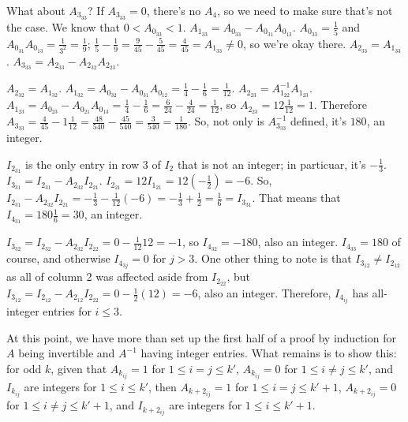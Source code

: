 \documentclass[12pt]{article}
\begin{document}
\begin{enumerate}
    What about $A_{3_{33}}$? If $A_{3_{33}} = 0$, there's no
    $A_4$, so we need to make sure that's not the case. We know
    that $0 < A_{0_{33}} < 1$. $A_{1_{33}} = A_{0_{33}} -
    A_{0_{31}}A_{0_{13}}$. $A_{0_{33}} = \frac{1}{5}$ and
    $A_{0_{31}}A_{0_{13}} = \frac{1}{3^{2}} = \frac{1}{9}$;
    $\frac{1}{5} - \frac{1}{9} = \frac{9}{45} - \frac{5}{45} =
    \frac{4}{45} = A_{1_{33}} \neq 0$, so we're okay there.
    $A_{2_{33}} = A_{1_{33}}$. $A_{3_{33}} = A_{2_{33}} -
    A_{2_{32}}A_{2_{23}}$.

    $A_{2_{32}} = A_{1_{32}}$. $A_{1_{32}} = A_{0_{32}} -
    A_{0_{31}}A_{0_{12}} = \frac{1}{4} - \frac{1}{6} =
    \frac{1}{12}$.  $A_{2_{23}} = A_{1_{22}}^{-1}A_{1_{23}}$.
    $A_{1_{23}} = A_{0_{23}} - A_{0_{21}}A_{0_{13}} = \frac{1}{4}
    - \frac{1}{6} = \frac{6}{24} - \frac{4}{24} = \frac{1}{12}$,
    so $A_{2_{23}} = 12\frac{1}{12} = 1$. Therefore $A_{3_{33}} =
    \frac{4}{45} - 1\frac{1}{12} = \frac{48}{540} -
    \frac{45}{540} = \frac{3}{540} = \frac{1}{180}$. So, not only
    is $A_{3_{33}}^{-1}$ defined, it's $180$, an integer.

    $I_{2_{31}}$ is the only entry in row 3 of $I_2$ that is not
    an integer; in particuar, it's $-\frac{1}{3}$. $I_{3_{31}} =
    I_{2_{31}} - A_{2_{32}}I_{2_{21}}$. $I_{2_{21}} = 12I_{1_21}
    = 12(-\frac{1}{2}) = -6$. So, $I_{2_{31}} -
    A_{2_{32}}I_{2_{21}} = -\frac{1}{3} - \frac{1}{12}(-6) =
    -\frac{1}{3} + \frac{1}{2} = \frac{1}{6} = I_{3_{31}}$. That
    means that $I_{4_{31}} = 180\frac{1}{6} = 30$, an integer.

    $I_{3_{32}} = I_{2_{32}} - A_{2_{32}}I_{2_{22}} = 0 -
    \frac{1}{12}12 = -1$, so $I_{4_{32}} = -180$, also an
    integer. $I_{4_{33}} = 180$ of course, and otherwise
    $I_{4_{3j}} = 0$ for $j > 3$. One other thing to note is that
    $I_{3_{12}} \neq I_{2_{12}}$ as all of column 2 was affected
    aside from $I_{2_{22}}$, but $I_{3_{12}} = I_{2_{12}} -
    A_{2_{12}}I_{2_{22}} = 0 - \frac{1}{2}(12) = -6$, also an
    integer. Therefore, $I_{4_{ij}}$ has all-integer entries for
    $i \leq 3$.

    At this point, we have more than set up the first half of a
    proof by induction for $A$ being invertible and $A^{-1}$
    having integer entries. What remains is to show this: for odd
    $k$, given that $A_{k_{ij}} = 1$ for $1 \leq i = j \leq k'$,
    $A_{k_{ij}} = 0$ for $1 \leq i \neq j \leq k'$, and
    $I_{k_{ij}}$ are integers for $1 \leq i \leq k'$, then
    $A_{k+2_{ij}} = 1$ for $1 \leq i = j \leq k' + 1$,
    $A_{k+2_{ij}} = 0$ for $1 \leq i \neq j \leq k' + 1$, and
    $I_{k+2_{ij}}$ are integers for $1 \leq i \leq k' + 1$.


\end{enumerate}
\end{document}

